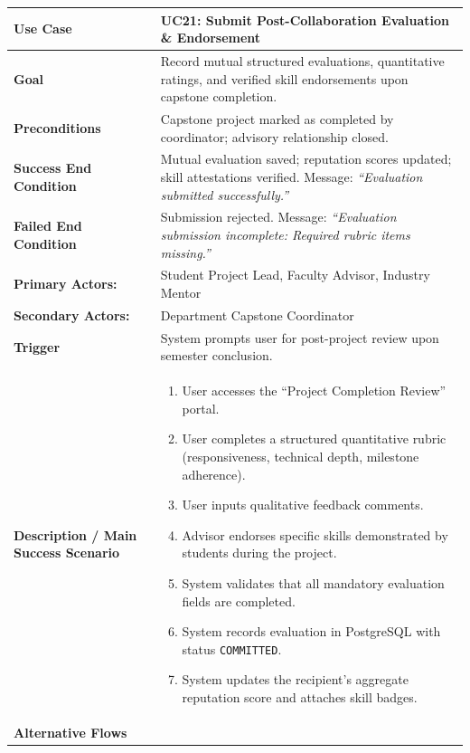 \begin{table}[H]
\centering
\small
\begin{tabularx}{\textwidth}{|l|X|}
\hline
\rowcolor{lightgray!40} \textbf{Use Case} & \textbf{UC21: Submit Post-Collaboration Evaluation \& Endorsement} \\ \hline
\textbf{Goal} & Record mutual structured evaluations, quantitative ratings, and verified skill endorsements upon capstone completion. \\ \hline
\textbf{Preconditions} & Capstone project marked as completed by coordinator; advisory relationship closed. \\ \hline
\textbf{Success End Condition} & Mutual evaluation saved; reputation scores updated; skill attestations verified. Message: \textit{``Evaluation submitted successfully.''} \\ \hline
\textbf{Failed End Condition} & Submission rejected. Message: \textit{``Evaluation submission incomplete: Required rubric items missing.''} \\ \hline
\textbf{Primary Actors:} & Student Project Lead, Faculty Advisor, Industry Mentor \\
\textbf{Secondary Actors:} & Department Capstone Coordinator \\ \hline
\textbf{Trigger} & System prompts user for post-project review upon semester conclusion. \\ \hline
\textbf{Description / Main Success Scenario} &
\begin{enumerate}[leftmargin=*]
    \item User accesses the ``Project Completion Review'' portal.
    \item User completes a structured quantitative rubric (responsiveness, technical depth, milestone adherence).
    \item User inputs qualitative feedback comments.
    \item Advisor endorses specific skills demonstrated by students during the project.
    \item System validates that all mandatory evaluation fields are completed.
    \item System records evaluation in PostgreSQL with status \texttt{COMMITTED}.
    \item System updates the recipient's aggregate reputation score and attaches skill badges.
\end{enumerate} \\ \hline
\textbf{Alternative Flows} &
\begin{itemize}[leftmargin=*]

\end{itemize}
\end{tabularx}
\end{table}
